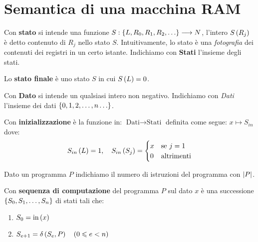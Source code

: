 \documentclass{lectures}
\begin{document}
\section{Semantica di una macchina RAM}
\begin{multicols}{2}
    \begin{definition}
        Con \textbf{stato} si intende una funzione \(S:\left\{L,R_0, R_1,R_2,\ldots\right\}\longrightarrow N\), l'intero \(S\left(R_j\right)\) è detto contenuto di \(R_j\) nello stato \(S\). Intuitivamente, lo stato è una \textit{fotografia} dei contenuti dei registri in un certo istante. Indichiamo con \textbf{Stati} l'insieme degli stati.
    \end{definition}
    \begin{definition}
        Lo \textbf{stato finale} è uno stato \(S\) in cui \(S\left(L\right) = 0\).
    \end{definition}
    \begin{definition}[Dato]
        Con \textbf{Dato} si intende un qualsiasi intero non negativo. Indichiamo con \textit{Dati} l'insieme dei dati \(\left\{0,1,2,\ldots,n\ldots\right\}\).
    \end{definition}
    \begin{definition}
        Con \textbf{inizializzazione} è la funzione in: \(\text{Dati}\rightarrow\text{Stati}\) definita come segue:
        \(
            x \mapsto S_{in}
        \) dove:
        \[
            S_{in}\left(L\right) = 1, \quad S_{in}\left(S_j\right) = \begin{cases}
                x & \text{se }j=1\\
                0 & \text{altrimenti}
            \end{cases}
        \]
    \end{definition}
    \begin{definition}
        Dato un programma \(P\) indichiamo il numero di istruzioni del programma con \(\left\lvert P\right\rvert\).
    \end{definition}
    \begin{definition}
        Con \textbf{sequenza di computazione} del programma \(P\) sul dato \(x\) è una successione \(\left\{S_0, S_1, \ldots, S_n\right\}\) di stati tali che:
        \begin{enumerate}
            \item \(S_0 = \text{in}\left(x\right)\)
            \item \(S_{e+1} = \delta\left(S_e, P\right) \quad \left(0 \leqslant e < n\right)\)

\end{enumerate}
\end{definition}
\end{multicols}
\end{document}

